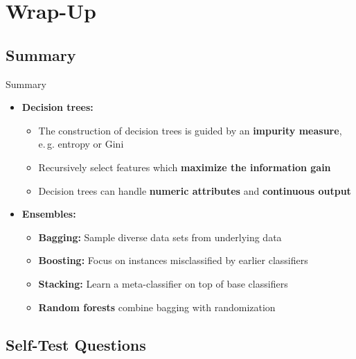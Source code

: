\section{Wrap-Up}

\subsection{Summary}

\begin{frame}{Summary}{}
	\begin{itemize}
		\item \textbf{Decision trees:}
		\begin{itemize}
			\item The construction of decision trees is guided by an \textbf{impurity measure}, \\
				e.\,g. entropy or Gini
			\item Recursively select features which \textbf{maximize the information gain}
			\item Decision trees can handle \textbf{numeric attributes} and \textbf{continuous output}
		\end{itemize}
		\item \textbf{Ensembles:}
		\begin{itemize}
			\item \textbf{Bagging:} Sample diverse data sets from underlying data
			\item \textbf{Boosting:} Focus on instances misclassified by earlier classifiers
			\item \textbf{Stacking:} Learn a meta-classifier on top of base classifiers
			\item \textbf{Random forests} combine bagging with randomization
		\end{itemize}
	\end{itemize}
\end{frame}


\subsection{Self-Test Questions}

